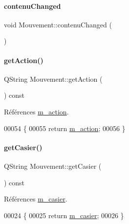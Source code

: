 \paragraph{\texorpdfstring{contenu\+Changed}{contenuChanged}}
{\footnotesize\ttfamily void Mouvement\+::contenu\+Changed (\begin{DoxyParamCaption}{ }\end{DoxyParamCaption})\hspace{0.3cm}{\ttfamily [signal]}}

\mbox{\label{class_mouvement_a683576b69fc9ab0bef8b85b1468408e2}} 
\paragraph{\texorpdfstring{get\+Action()}{getAction()}}
{\footnotesize\ttfamily Q\+String Mouvement\+::get\+Action (\begin{DoxyParamCaption}{ }\end{DoxyParamCaption}) const}



Références \hyperlink{class_mouvement_af0444a7f837bdf252f2a3ccd4eb8a701}{m\+\_\+action}.


\begin{DoxyCode}
00054 \{
00055     \textcolor{keywordflow}{return} \hyperlink{class_mouvement_af0444a7f837bdf252f2a3ccd4eb8a701}{m\_action};
00056 \}
\end{DoxyCode}
\mbox{\label{class_mouvement_ae3ebc2911605104452a612aaf8a48e64}} 
\paragraph{\texorpdfstring{get\+Casier()}{getCasier()}}
{\footnotesize\ttfamily Q\+String Mouvement\+::get\+Casier (\begin{DoxyParamCaption}{ }\end{DoxyParamCaption}) const}



Références \hyperlink{class_mouvement_a186f483cf82ff2866da1e10031838567}{m\+\_\+casier}.


\begin{DoxyCode}
00024 \{
00025     \textcolor{keywordflow}{return} \hyperlink{class_mouvement_a186f483cf82ff2866da1e10031838567}{m\_casier};
00026 \}
\end{DoxyCode}
\mbox{\label{class_mouvement_a6a288ea183789e4b99f6f520ff7a32ab}} 
